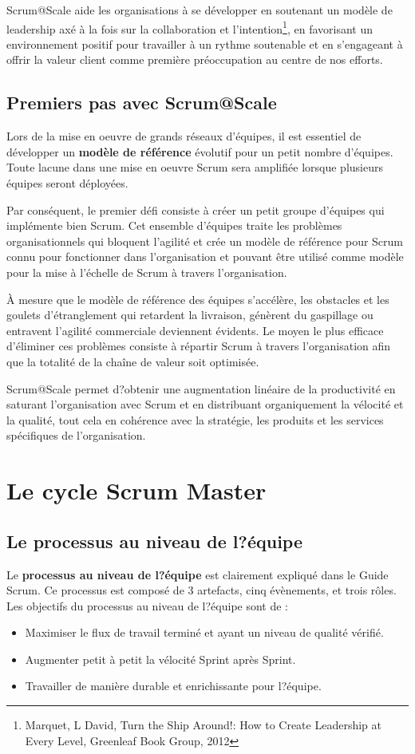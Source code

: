 \documentclass[12pt,a4paper,parskip=full]{scrartcl}
\begin{document}
Scrum@Scale aide les organisations à se développer en soutenant un modèle de
leadership axé à la fois sur la collaboration et l'intention\footnote{Marquet, L
David, Turn the Ship Around!: How to Create Leadership at Every Level,
Greenleaf Book Group, 2012}, en favorisant un environnement
positif pour travailler à un rythme soutenable et en s'engageant à offrir la valeur client
comme première préoccupation au centre de nos efforts.

\subsection{Premiers pas avec Scrum@Scale}
Lors de la mise en oeuvre de grands réseaux d'équipes, il est essentiel de développer un
\textbf{modèle de référence} évolutif pour un petit nombre d'équipes. Toute lacune dans une
mise en oeuvre Scrum sera amplifiée lorsque plusieurs équipes seront déployées.

Par conséquent, le premier défi consiste à créer un petit groupe d'équipes qui implémente
bien Scrum. Cet ensemble d'équipes traite les problèmes organisationnels qui bloquent
l'agilité et crée un modèle de référence pour Scrum connu pour fonctionner dans
l'organisation et pouvant être utilisé comme modèle pour la mise à l'échelle de Scrum à
travers l'organisation.

À mesure que le modèle de référence des équipes s'accélère, les obstacles et les goulets
d'étranglement qui retardent la livraison, génèrent du gaspillage ou entravent l'agilité
commerciale deviennent évidents. Le moyen le plus efficace d'éliminer ces problèmes
consiste à répartir Scrum à travers l'organisation afin que la totalité de la chaîne de valeur
soit optimisée.

Scrum@Scale permet d?obtenir une augmentation linéaire de la productivité en saturant
l'organisation avec Scrum et en distribuant organiquement la vélocité et la qualité, tout
cela en cohérence avec la stratégie, les produits et les services spécifiques de
l'organisation.

\section{Le cycle Scrum Master}
\subsection{Le processus au niveau de l?équipe}
Le \textbf{processus au niveau de l?équipe} est clairement expliqué dans le Guide Scrum. Ce
processus est composé de 3 artefacts, cinq évènements, et trois rôles. Les objectifs du
processus au niveau de l?équipe sont de :
\begin{itemize}
\item Maximiser le flux de travail terminé et ayant un niveau de qualité vérifié.
\item Augmenter petit à petit la vélocité Sprint après Sprint.
\item Travailler de manière durable et enrichissante pour l?équipe.
\end{itemize}
\end{document}
